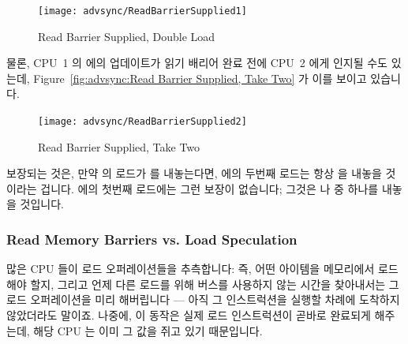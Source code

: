 \begin{enumerate}
\begin{figure}[htb]
\begin{center}
\texttt{[image: advsync/ReadBarrierSupplied1]}
\end{center}
\caption{Read Barrier Supplied, Double Load}
\end{figure}

물론, CPU~1 의  에의 업데이트가 읽기 배리어 완료 전에 CPU~2 에게 인지될
수도 있는데, Figure~\ref{fig:advsync:Read Barrier Supplied, Take Two} 가 이를
보이고 있습니다.

\begin{figure}[htb]
\begin{center}
\texttt{[image: advsync/ReadBarrierSupplied2]}
\end{center}
\caption{Read Barrier Supplied, Take Two}
\end{figure}

보장되는 것은, 만약  의 로드가  를 내놓는다면,  에의
두번째 로드는 항상  을 내놓을 것이라는 겁니다.
 에의 첫번째 로드에는 그런 보장이 없습니다; 그것은  나
 중 하나를 내놓을 것입니다.

\subsubsection{Read Memory Barriers vs. Load Speculation}
\label{sec:advsync:Read Memory Barriers vs. Load Speculation}

많은 CPU 들이 로드 오퍼레이션들을 추측합니다: 즉, 어떤 아이템을 메모리에서
로드해야 할지, 그리고 언제 다른 로드를 위해 버스를 사용하지 않는 시간을
찾아내서는 그 로드 오퍼레이션을 미리 해버립니다 --- 아직 그 인스트럭션을 실행할
차례에 도착하지 않았더라도 말이죠.
나중에, 이 동작은 실제 로드 인스트럭션이 곧바로 완료되게 해주는데, 해당 CPU 는
이미 그 값을 쥐고 있기 때문입니다.


\end{enumerate}
